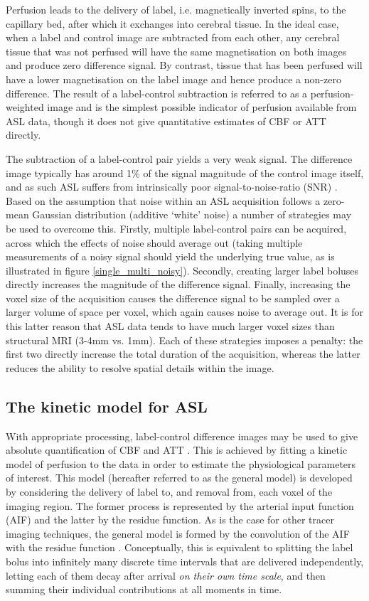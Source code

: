 \documentclass[12pt]{report}
\begin{document}
Perfusion leads to the delivery of label, i.e. magnetically inverted spins, to the capillary bed, after which it exchanges into cerebral tissue. In the ideal case, when a label and control image are subtracted from each other, any cerebral tissue that was not perfused will have the same magnetisation on both images and produce zero difference signal. By contrast, tissue that has been perfused will have a lower magnetisation on the label image and hence produce a non-zero difference. The result of a label-control subtraction is referred to as a perfusion-weighted image and is the simplest possible indicator of perfusion available from ASL data, though it does not give quantitative estimates of CBF or ATT directly. 

The subtraction of a label-control pair yields a very weak signal. The difference image typically has around 1\% of the signal magnitude of the control image itself, and as such ASL suffers from intrinsically poor signal-to-noise-ratio (SNR) \cite{Li2018}. Based on the assumption that noise within an ASL acquisition follows a zero-mean Gaussian distribution (additive `white' noise) a number of strategies may be used to overcome this. Firstly, multiple label-control pairs can be acquired, across which the effects of noise should average out (taking multiple measurements of a noisy signal should yield the underlying true value, as is illustrated in figure \ref{single_multi_noisy}). Secondly, creating larger label boluses directly increases the magnitude of the difference signal. Finally, increasing the voxel size of the acquisition causes the difference signal to be sampled over a larger volume of space per voxel, which again causes noise to average out. It is for this latter reason that ASL data tends to have much larger voxel sizes than structural MRI (3-4mm vs. 1mm). Each of these strategies imposes a penalty: the first two directly increase the total duration of the acquisition, whereas the latter reduces the ability to resolve spatial details within the image. 


\subsection{The kinetic model for ASL} 
\label{asl_kinetic_section}

With appropriate processing, label-control difference images may be used to give absolute quantification of CBF and ATT \cite{asl_primer}. This is achieved by fitting a kinetic model of perfusion to the data in order to estimate the physiological parameters of interest. This model (hereafter referred to as the general model) is developed by considering the delivery of label to, and removal from, each voxel of the imaging region. The former process is represented by the arterial input function (AIF) and the latter by the residue function. As is the case for other tracer imaging techniques, the general model is formed by the convolution of the AIF with the residue function \cite{Buxton1998}. Conceptually, this is equivalent to splitting the label bolus into infinitely many discrete time intervals that are delivered independently, letting each of them decay after arrival \textit{on their own time scale}, and then summing their individual contributions at all moments in time. 
\end{document}
